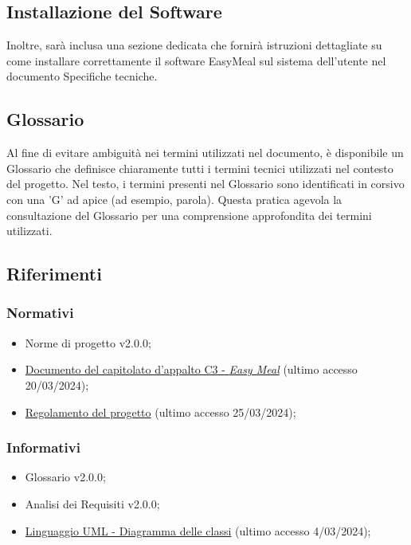 \subsection{Installazione del Software}
Inoltre, sarà inclusa una sezione dedicata che fornirà istruzioni dettagliate su come installare correttamente il software EasyMeal sul sistema 
dell'utente nel documento Specifiche tecniche.


\subsection{Glossario}
Al fine di evitare ambiguità nei termini utilizzati nel documento, è disponibile un Glossario che definisce chiaramente tutti i 
termini tecnici utilizzati nel contesto del progetto. Nel testo, i termini presenti nel Glossario sono identificati in corsivo 
con una 'G' ad apice (ad esempio, parola\g ). 
Questa pratica agevola la consultazione del Glossario per una comprensione approfondita dei termini utilizzati.

\subsection{Riferimenti}
\subsubsection{Normativi}
\begin{itemize}
	\item Norme di progetto v2.0.0;
	\item 	\href{https://www.math.unipd.it/~tullio/IS-1/2023/Progetto/C3.pdf}
	      {Documento del capitolato d'appalto C3 - \textit{Easy Meal}} (ultimo accesso 20/03/2024);
	\item \href{https://www.math.unipd.it/~tullio/IS-1/2023/Dispense/PD2.pdf}
	      {Regolamento del progetto} (ultimo accesso 25/03/2024); 
\end{itemize}

\subsubsection{Informativi}
\begin{itemize}
	\item Glossario v2.0.0;
	\item Analisi dei Requisiti v2.0.0;
	\item \href{https://www.math.unipd.it/~rcardin/swea/2023/Diagrammi\%20delle\%20Classi.pdf}
	      {Linguaggio UML - Diagramma delle classi} (ultimo accesso 4/03/2024); 
\end{itemize}

